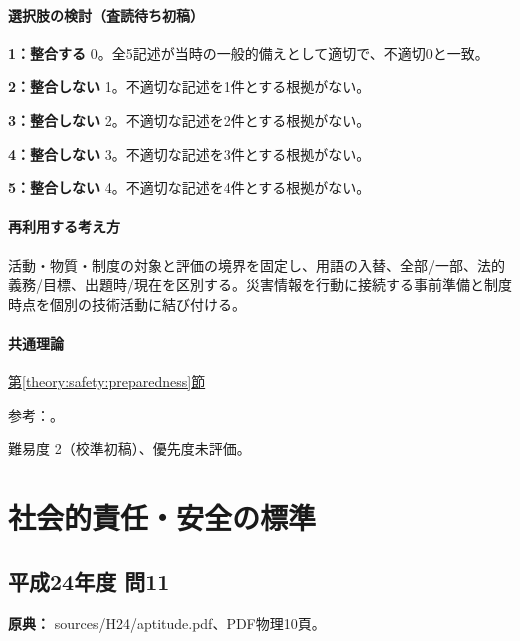\paragraph{選択肢の検討（査読待ち初稿）}\mbox{}\par

\noindent\textbf{1：整合する} 0。全5記述が当時の一般的備えとして適切で、不適切0と一致。\par

\noindent\textbf{2：整合しない} 1。不適切な記述を1件とする根拠がない。\par

\noindent\textbf{3：整合しない} 2。不適切な記述を2件とする根拠がない。\par

\noindent\textbf{4：整合しない} 3。不適切な記述を3件とする根拠がない。\par

\noindent\textbf{5：整合しない} 4。不適切な記述を4件とする根拠がない。\par

\paragraph{再利用する考え方} 活動・物質・制度の対象と評価の境界を固定し、用語の入替、全部/一部、法的義務/目標、出題時/現在を区別する。災害情報を行動に接続する事前準備と制度時点を個別の技術活動に結び付ける。

\paragraph{共通理論} \hyperref[theory:safety:preparedness]{第\ref*{theory:safety:preparedness}節}

\par 参考：\cite{env_ar5,env_rain2017,env_evac2021,env_warning2026}。

\par 難易度 2（校準初稿）、優先度未評価。

\section{社会的責任・安全の標準}

\subsection{平成24年度 問11}
\label{q:h24-reg-apt-11}

\noindent\textbf{原典：} sources/H24/aptitude.pdf、PDF物理10頁。

